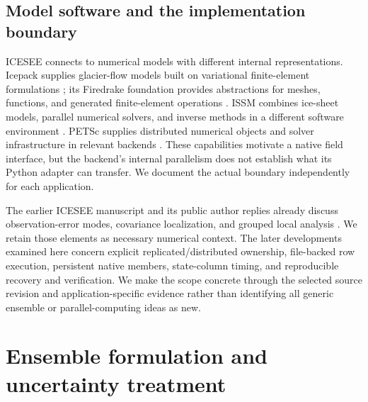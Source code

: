 \documentclass[11pt,a4paper]{article}
\begin{document}
\subsection{Model software and the implementation boundary}
ICESEE connects to numerical models with different internal representations. Icepack supplies glacier-flow models built on variational finite-element formulations \citep{shapero2021}; its Firedrake foundation provides abstractions for meshes, functions, and generated finite-element operations \citep{rathgeber2016}. ISSM combines ice-sheet models, parallel numerical solvers, and inverse methods in a different software environment \citep{larour2012}. PETSc supplies distributed numerical objects and solver infrastructure in relevant backends \citep{petsc2025}. These capabilities motivate a native field interface, but the backend's internal parallelism does not establish what its Python adapter can transfer. We document the actual boundary independently for each application.

The earlier ICESEE manuscript and its public author replies already discuss observation-error modes, covariance localization, and grouped local analysis \citep{kyanjo2026,egusphere2026}. We retain those elements as necessary numerical context. The later developments examined here concern explicit replicated/distributed ownership, file-backed row execution, persistent native members, state-column timing, and reproducible recovery and verification. We make the scope concrete through the selected source revision and application-specific evidence rather than identifying all generic ensemble or parallel-computing ideas as new.

\section{Ensemble formulation and uncertainty treatment}
\end{document}
